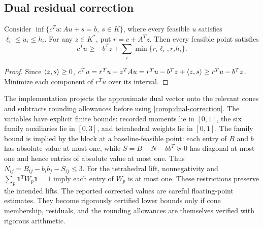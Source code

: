 \subsection{Dual residual correction}

\begin{proposition}\label{comp:dual-bound}
Consider $\inf\{c^Tu:Au+s=b,\ s\in K\}$, where every feasible $u$
satisfies $\ell_i\leq u_i\leq h_i$. For any $z\in K^*$, put
$r=c+A^Tz$. Then every feasible point satisfies
\begin{equation}\label{comp:dual-correction}
 c^Tu\geq-b^Tz+\sum_i\min\{r_i\ell_i,r_ih_i\}.
\end{equation}
\end{proposition}

\begin{proof}
Since $\left\langle z,s\right\rangle\geq0$,
$c^Tu=r^Tu-z^TAu=r^Tu-b^Tz+\left\langle z,s\right\rangle
\geq r^Tu-b^Tz$. Minimize each component of $r^Tu$ over its interval.
\end{proof}

The implementation projects the approximate dual vector onto the relevant
cones and subtracts rounding allowances before using
\eqref{comp:dual-correction}. The variables have explicit finite bounds:
recorded moments lie in $[0,1]$, the six family auxiliaries lie in
$[0,3]$, and tetrahedral weights lie in $[0,1]$. The family bound is
implied by the block at a baseline-feasible point: each entry of $B$
and $b$ has absolute value at most one, while
$S=B-N-bb^T\succeq0$ has diagonal at most one and hence entries
of absolute value at most one. Thus $N_{ij}=B_{ij}-b_ib_j-S_{ij}\leq3$.
For the tetrahedral lift, nonnegativity and
$\sum_p\mathbf1^TW_p\mathbf1=1$ imply each entry of $W_p$ is at
most one. These restrictions preserve the intended lifts. The reported corrected values are careful
floating-point estimates. They become rigorously certified lower bounds
only if cone membership, residuals, and the rounding allowances are
themselves verified with rigorous arithmetic.
